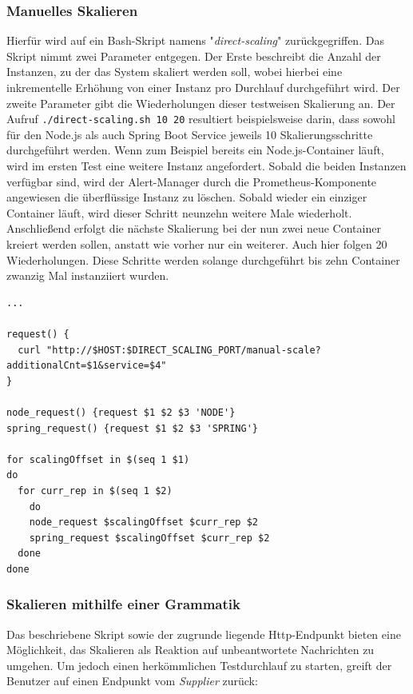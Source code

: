 \subsubsection{Manuelles Skalieren}
\label{erklaerungDirScal}
Hierfür wird auf ein Bash-Skript namens "\emph{direct-scaling}" zurückgegriffen. Das Skript nimmt zwei Parameter entgegen. Der Erste beschreibt die Anzahl der Instanzen, zu der das System skaliert werden soll, wobei hierbei eine inkrementelle Erhöhung von einer Instanz pro Durchlauf durchgeführt wird. Der zweite Parameter gibt die Wiederholungen dieser testweisen Skalierung an. Der Aufruf \verb+./direct-scaling.sh 10 20+ resultiert beispielsweise darin, dass sowohl für den Node.js als auch Spring Boot Service jeweils 10 Skalierungsschritte durchgeführt werden. Wenn zum Beispiel bereits ein Node.js-Container läuft, wird im ersten Test eine weitere Instanz angefordert. Sobald die beiden Instanzen verfügbar sind, wird der Alert-Manager durch die Prometheus-Komponente angewiesen die überflüssige Instanz zu löschen. Sobald wieder ein einziger Container läuft, wird dieser Schritt neunzehn weitere Male wiederholt. Anschließend erfolgt die nächste Skalierung bei der nun zwei neue Container kreiert werden sollen, anstatt wie vorher nur ein weiterer. Auch hier folgen 20 Wiederholungen. Diese Schritte werden solange durchgeführt bis zehn Container zwanzig Mal instanziiert wurden.

\label{lst:direct-scaling}
\begin{minipage}{\linewidth}
\begin{lstlisting}[caption={direct-scaling.sh},style=bashStyle]
...

request() {
  curl "http://$HOST:$DIRECT_SCALING_PORT/manual-scale?additionalCnt=$1&service=$4"
}

node_request() {request $1 $2 $3 'NODE'}
spring_request() {request $1 $2 $3 'SPRING'}

for scalingOffset in $(seq 1 $1)
do 
  for curr_rep in $(seq 1 $2)
	do 
    node_request $scalingOffset $curr_rep $2
    spring_request $scalingOffset $curr_rep $2
  done
done
\end{lstlisting}
\end{minipage}

\subsubsection{Skalieren mithilfe einer Grammatik}
Das beschriebene Skript sowie der zugrunde liegende Http-Endpunkt bieten eine Möglichkeit, das Skalieren als Reaktion auf unbeantwortete Nachrichten zu umgehen. Um jedoch einen herkömmlichen Testdurchlauf zu starten, greift der Benutzer auf einen Endpunkt vom \emph{Supplier} zurück: 

